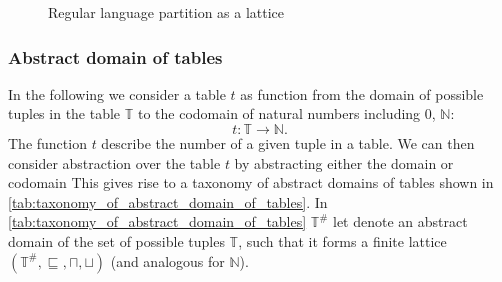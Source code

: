 \begin{figure}[!htb]
    \center
    \caption{Regular language partition as a lattice}
    \label{fig:tikz-reg-partition-lattice}
\end{figure}

\subsubsection{Abstract domain of tables}\label{subsubsec:abstract_domain_of_tables}

In the following we consider a table $t$ as function from the domain of possible tuples in the table $\mathbb{T}$ to the codomain of natural numbers including $0$, $\mathbb{N}$:
\begin{equation}
    t : \mathbb{T} \rightarrow \mathbb{N}.
\end{equation}
The function $t$ describe the number of a given tuple in a table.
We can then consider abstraction over the table $t$ by abstracting either the domain or codomain
This gives rise to a taxonomy of abstract domains of tables shown in \autoref{tab:taxonomy_of_abstract_domain_of_tables}.
In \autoref{tab:taxonomy_of_abstract_domain_of_tables} $\mathbb{T}^\#$ let denote an abstract domain of the set of possible tuples $\mathbb{T}$, such that it forms a finite lattice $(\mathbb{T}^\#, \sqsubseteq, \sqcap, \sqcup)$ (and analogous for $\mathbb{N}$).

